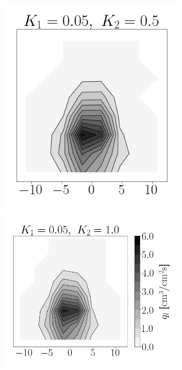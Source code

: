 \begin{figure}[t!]
\begin{subfigure}[b]{0.2\textwidth}
\end{subfigure}
\hspace*{0.02in}
\begin{subfigure}[b]{0.2\textwidth}
	\flushleft
   \includegraphics[scale=0.4]{./part2_developments/figures_ch6_lagrangian_JICF/apte_model_calibration_u_vw_lognorm/maps/k1_0p05_k2_0p5_flux}
\end{subfigure}
\hspace*{0.02in}
\begin{subfigure}[b]{0.2\textwidth}
	\flushleft
   \includegraphics[scale=0.4]{./part2_developments/figures_ch6_lagrangian_JICF/apte_model_calibration_u_vw_lognorm/maps/k1_0p05_k2_1p0_flux}
\end{subfigure}


\end{figure}
